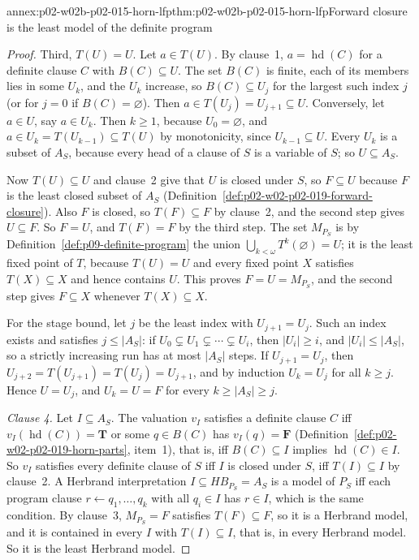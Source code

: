 \begin{annexitem}{annex:p02-w02b-p02-015-horn-lfp}{thm:p02-w02b-p02-015-horn-lfp}{Forward closure is the least model of the definite program}
\begin{proof}
Third, \(T(U)=U\).  Let \(a\in T(U)\).  By clause~1, \(a=\operatorname{hd}(C)\)
for a definite clause \(C\) with \(B(C)\subseteq U\).  The set \(B(C)\) is
finite, each of its members lies in some \(U_k\), and the \(U_k\) increase,
so \(B(C)\subseteq U_j\) for the largest such index \(j\) (or for \(j=0\) if
\(B(C)=\varnothing\)).  Then \(a\in T(U_j)=U_{j+1}\subseteq U\).  Conversely,
let \(a\in U\), say \(a\in U_k\).  Then \(k\geq1\), because
\(U_0=\varnothing\), and \(a\in U_k=T(U_{k-1})\subseteq T(U)\) by
monotonicity, since \(U_{k-1}\subseteq U\).  Every \(U_k\) is a subset of
\(A_S\), because every head of a clause of \(S\) is a variable of \(S\); so
\(U\subseteq A_S\).

Now \(T(U)\subseteq U\) and clause~2 give that \(U\) is closed under \(S\),
so \(F\subseteq U\) because \(F\) is the least closed subset of \(A_S\)
(Definition~\ref{def:p02-w02-p02-019-forward-closure}).  Also \(F\) is closed,
so \(T(F)\subseteq F\) by clause~2, and the second step gives
\(U\subseteq F\).  So \(F=U\), and \(T(F)=F\) by the third step.  The set
\(M_{P_S}\) is by Definition~\ref{def:p09-definite-program} the union
\(\bigcup_{k<\omega}T^k(\varnothing)=U\); it is the least fixed point of
\(T\), because \(T(U)=U\) and every fixed point \(X\) satisfies
\(T(X)\subseteq X\) and hence contains \(U\).  This proves
\(F=U=M_{P_S}\), and the second step gives \(F\subseteq X\) whenever
\(T(X)\subseteq X\).

For the stage bound, let \(j\) be the least index with \(U_{j+1}=U_j\).  Such
an index exists and satisfies \(j\leq|A_S|\): if \(U_0\subsetneq
U_1\subsetneq\cdots\subsetneq U_i\), then \(|U_i|\geq i\), and \(|U_i|\leq
|A_S|\), so a strictly increasing run has at most \(|A_S|\) steps.  If
\(U_{j+1}=U_j\), then \(U_{j+2}=T(U_{j+1})=T(U_j)=U_{j+1}\), and by induction
\(U_k=U_j\) for all \(k\geq j\).  Hence \(U=U_j\), and \(U_k=U=F\) for every
\(k\geq|A_S|\geq j\).

\emph{Clause 4.}  Let \(I\subseteq A_S\).  The valuation \(v_I\) satisfies a
definite clause \(C\) iff \(v_I(\operatorname{hd}(C))=\mathbf T\) or some
\(q\in B(C)\) has \(v_I(q)=\mathbf F\)
(Definition~\ref{def:p02-w02-p02-019-horn-parts}, item~1), that is, iff
\(B(C)\subseteq I\) implies \(\operatorname{hd}(C)\in I\).  So \(v_I\)
satisfies every definite clause of \(S\) iff \(I\) is closed under \(S\),
iff \(T(I)\subseteq I\) by clause~2.  A Herbrand interpretation
\(I\subseteq\mathit{HB}_{P_S}=A_S\) is a model of \(P_S\) iff each program
clause \(r\leftarrow q_1,\ldots,q_k\) with all \(q_i\in I\) has \(r\in I\),
which is the same condition.  By clause~3, \(M_{P_S}=F\) satisfies
\(T(F)\subseteq F\), so it is a Herbrand model, and it is contained in every
\(I\) with \(T(I)\subseteq I\), that is, in every Herbrand model.  So it is
the least Herbrand model.


\end{proof}
\end{annexitem}
